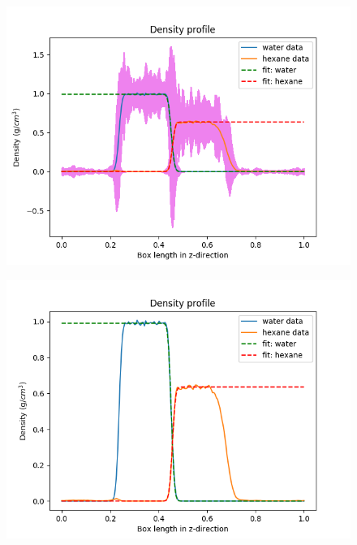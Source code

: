 \documentclass[12pt,reqno]{amsart}
\numberwithin{equation}{section}
\begin{document}
\begin{enumerate}
\begin{figure}[H]
\centering
\includegraphics[scale=0.6]{interface_density_profile_individualfit_NVTequil-32bead-long}
\end{figure}

\begin{figure}[H]
\centering
\includegraphics[scale=0.6]{interface_density_profile_simultaneousfit_NVTequil-32bead-long-noSE}
\end{figure}


\end{enumerate}
\end{document}
